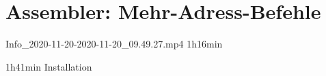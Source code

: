 \documentclass{lehramt-informatik-haupt}
\begin{document}

\chapter{Assembler: Mehr-Adress-Befehle}

Info_2020-11-20-2020-11-20_09.49.27.mp4 1h16min

1h41min Installation

\literatur
\end{document}
